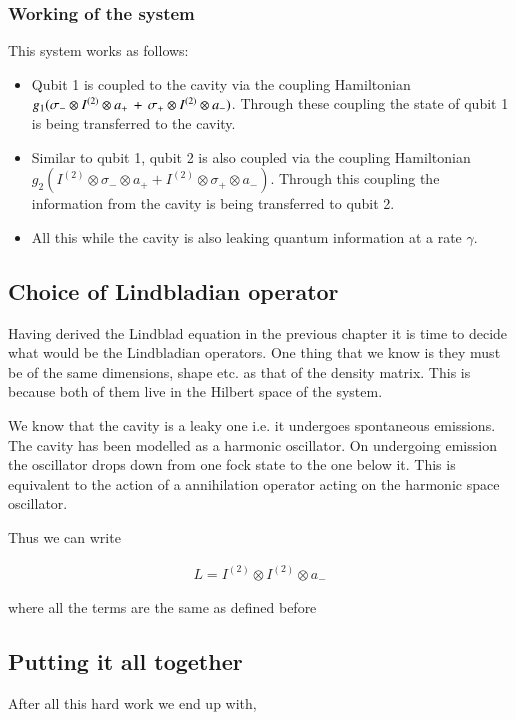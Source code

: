\subsubsection{Working of the system } 
This system works as follows:
\begin{itemize}
\item Qubit 1 is coupled to the cavity via the coupling Hamiltonian ${g}_{1}({\sigma  }_{ - }\otimes I^{(2)}\otimes { a }_{ + }\thinspace + \thinspace{ \sigma }_{+}\otimes I^{(2)}\otimes{a}_{ - })$. Through these coupling the state of qubit 1 is  being transferred to the cavity.
\item Similar to qubit 1, qubit 2 is also coupled via the coupling Hamiltonian ${g}_{2}\left(I^{(2)}\otimes { \sigma  }_{ - }\otimes { a }_{ + }+I^{(2)}\otimes { \sigma  }_{ + }\otimes { a }_{ - }\right)$. Through this coupling the information from the cavity is being transferred to qubit 2.
\item All this while the cavity is also leaking quantum information at a rate $\gamma$.
\end{itemize}

\subsection{Choice of Lindbladian operator}

Having derived the Lindblad equation in the previous chapter it is time to decide what would be the Lindbladian operators. One thing that we know is they must be of the same dimensions, shape etc. as that of the density matrix. This is because both of them live in the Hilbert space of the system.
\par 
We know that the cavity is a leaky one i.e. it undergoes spontaneous emissions. The cavity has been modelled as a harmonic oscillator. On undergoing emission the oscillator drops down from one fock state to the one below it. This is equivalent to the action of a annihilation operator acting on the harmonic space oscillator.
\par
Thus we can write 

\begin{align}\label{eq:1001}
L = I^{(2)} \otimes I^{(2)} \otimes {a}_{-}
\end{align}

where all the terms are the same as defined before 

\subsection{Putting it all together}
After all this hard work we end up with,

